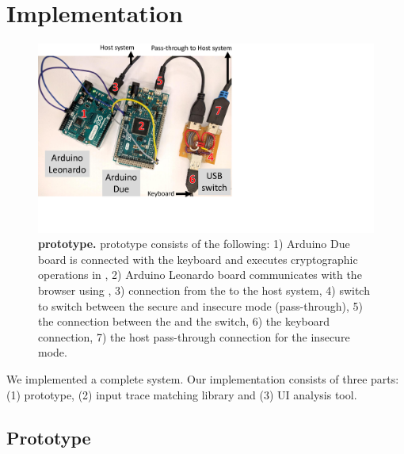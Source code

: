 \section{Implementation}
\label{sec:implementation_IK}

\begin{figure}[t]
  \centering
    \includegraphics[trim={0 2.5cm 14cm 0}, clip, width=0.75\linewidth]{chapters/IntegriKey/images/setup4_revised.pdf}
    \caption[\device prototype]{\textbf{\device prototype.} \device prototype consists of the following: 1) Arduino Due board is connected with the keyboard and executes cryptographic operations in \tls, 2) Arduino Leonardo board communicates with the browser using \webusb, 3) \usb connection from the \device to the host system, 4) \usb switch to switch between the secure and insecure mode (pass-through), 5) the connection between the \device and the \usb switch, 6) the keyboard connection, 7) the host pass-through connection for the insecure mode.}
    \label{fig:integrikeySetup}
\end{figure}

We implemented a complete \name system. Our implementation consists of three parts: (1) \device prototype, (2) \server input trace matching library and (3) \tool UI analysis tool. 

\subsection{\device Prototype} 


